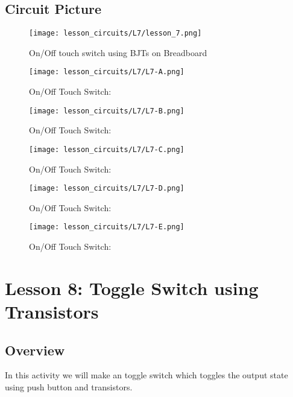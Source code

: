 \subsection{Circuit Picture}
\begin{figure}[htp]
    \centering
    \texttt{[image: lesson\_circuits/L7/lesson\_7.png]}
    \caption{On/Off touch switch using BJTs on Breadboard}
    \label{fig:onoff_sch}
\end{figure}
\begin{figure}[htp]
    \centering
    \texttt{[image: lesson\_circuits/L7/L7-A.png]}
    \caption{On/Off Touch Switch: }
    \label{fig:onoff_obb1}
\end{figure}
\begin{figure}[htp]
    \centering
    \texttt{[image: lesson\_circuits/L7/L7-B.png]}
    \caption{On/Off Touch Switch: }
    \label{fig:onoff_obb2}
\end{figure}
\begin{figure}[htp]
    \centering
    \texttt{[image: lesson\_circuits/L7/L7-C.png]}
    \caption{On/Off Touch Switch: }
    \label{fig:onoff_obb3}
\end{figure}
\begin{figure}[htp]
    \centering
    \texttt{[image: lesson\_circuits/L7/L7-D.png]}
    \caption{On/Off Touch Switch: }
    \label{fig:onoff_obb4}
\end{figure}
\begin{figure}[htp]
    \centering
    \texttt{[image: lesson\_circuits/L7/L7-E.png]}
    \caption{On/Off Touch Switch: }
    \label{fig:onoff_obb5}
\end{figure}


\section{Lesson 8: Toggle Switch using Transistors}
\subsection{Overview}
In this activity we will make an toggle switch which toggles the output state using push button and transistors.
